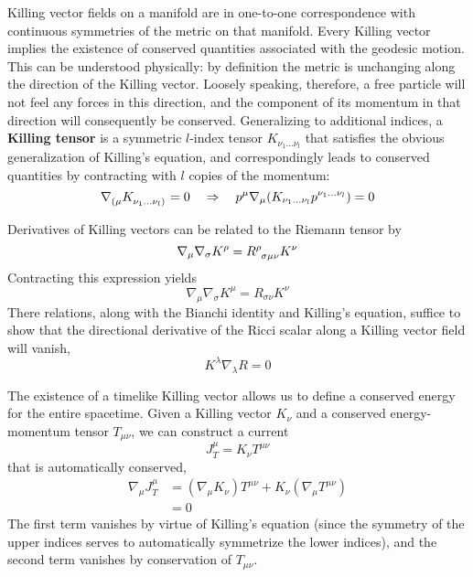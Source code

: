 Killing vector fields on a manifold are in one-to-one correspondence with continuous symmetries of the metric on that manifold. Every Killing vector implies the existence of conserved quantities associated with the geodesic motion. This can be understood physically: by definition the metric is unchanging along the direction of the Killing vector. Loosely speaking, therefore, a free particle will not feel any forces in this direction, and the component of its momentum in that direction will consequently be conserved. Generalizing to additional indices, a \textbf{Killing tensor} is a symmetric $l$-index tensor $K_{\nu_1 ... \nu_l}$ that satisfies the obvious generalization of Killing's equation, and correspondingly leads to conserved quantities by contracting with $l$ copies of the momentum:
\begin{equation*}
    \tensor{\nabla}{_{(\mu}}\tensor{K}{_{\nu_1 ...\nu_l)}}=0\quad \Rightarrow\quad p^\mu \nabla_\mu (K_{\nu_1 ...\nu_l}p^{\nu_1 ...\nu_l})=0
\end{equation*}

Derivatives of Killing vectors can be related to the Riemann tensor by
\begin{equation*}
    \nabla_\mu\nabla_\sigma K^\rho=\tensor{R}{^\rho_{\sigma\mu\nu}}K^\nu
\end{equation*}
Contracting this expression yields
\begin{equation*}
    \nabla_\mu \nabla_\sigma K^\mu=R_{\sigma\nu}K^\nu
\end{equation*}
There relations, along with the Bianchi identity and Killing's equation, suffice to show that the directional derivative of the Ricci scalar along a Killing vector field will vanish,
\begin{equation*}
    K^\lambda\nabla_\lambda R=0
\end{equation*}

The existence of a timelike Killing vector allows us to define a conserved energy for the entire spacetime. Given a Killing vector $K_\nu$ and a conserved energy-momentum tensor $T_{\mu\nu}$, we can construct a current
\begin{equation*}
    J_T^\mu=K_\nu T^{\mu\nu}
\end{equation*}
that is automatically conserved,
\begin{align*}
    \nabla_\mu J_T^\mu&=(\nabla_\mu K_\nu)T^{\mu\nu} + K_\nu (\nabla_\mu T^{\mu\nu})\\
    &=0
\end{align*}
The first term vanishes by virtue of Killing's equation (since the symmetry of the upper indices serves to automatically symmetrize the lower indices), and the second term vanishes by conservation of $T_{\mu\nu}$.

